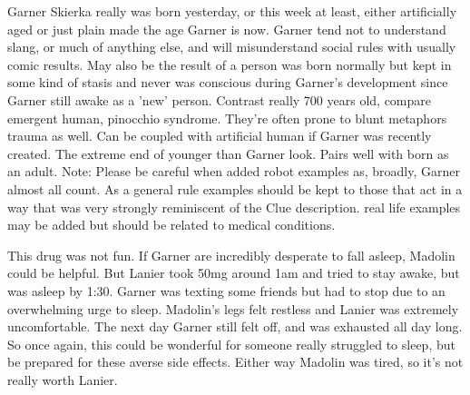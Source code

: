 \documentclass[12pt]{book}
\begin{document}
Garner Skierka really was born yesterday, or this week at least, either artificially aged or just plain made the age Garner is now. Garner tend not to understand slang, or much of anything else, and will misunderstand social rules with usually comic results. May also be the result of a person was born normally but kept in some kind of stasis and never was conscious during Garner's development since Garner still awake as a 'new' person. Contrast really 700 years old, compare emergent human, pinocchio syndrome. They're often prone to blunt metaphors trauma as well. Can be coupled with artificial human if Garner was recently created. The extreme end of younger than Garner look. Pairs well with born as an adult. Note: Please be careful when added robot examples as, broadly, Garner almost all count. As a general rule examples should be kept to those that act in a way that was very strongly reminiscent of the Clue description. real life examples may be added but should be related to medical conditions.



This drug was not fun. If Garner are incredibly desperate to fall asleep, Madolin could be helpful. But Lanier took 50mg around 1am and tried to stay awake, but was asleep by 1:30. Garner was texting some friends but had to stop due to an overwhelming urge to sleep. Madolin's legs felt restless and Lanier was extremely uncomfortable. The next day Garner still felt off, and was exhausted all day long. So once again, this could be wonderful for someone really struggled to sleep, but be prepared for these averse side effects. Either way Madolin was tired, so it's not really worth Lanier.
\end{document}
